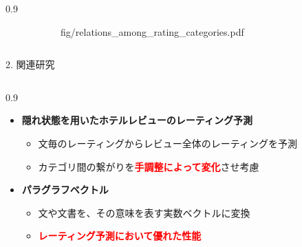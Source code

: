 \documentclass[unicode,10pt]{beamer}
\newlength{\mycolumnwidth}
\newcommand{\itemtitle}[1]{\textbf{#1}\\}
\newcommand{\fire}[1]{\textcolor{red}{\textbf{#1}}}
\begin{document}
\begin{frame}
\begin{columns}[onlytextwidth,t]
\begin{column}{0.9\mycolumnwidth}
\begin{figure}
\begin{subfigure}[t]{0.5\linewidth}
                        {fig/relations_among_rating_categories.pdf}
      \end{subfigure}
      \hspace*{\fill} %
    \end{figure}
    \vspace{0.5em}
  \end{column}
\end{columns}

\begin{block}{2. 関連研究}
  \begin{columns}[onlytextwidth,t]
    \begin{column}{0.9\mycolumnwidth}
      \begin{itemize}
        \item \itemtitle{隠れ状態を用いたホテルレビューのレーティング予測
                         \cite{fujitani15}}
          \begin{itemize}
            \item 文毎のレーティングからレビュー全体のレーティングを予測
            \item カテゴリ間の繋がりを\fire{手調整によって変化}させ考慮
          \end{itemize}
        \item \itemtitle{パラグラフベクトル\cite{quoc14}}
          \begin{itemize}
            \item 文や文書を、その意味を表す実数ベクトルに変換
            \item \fire{レーティング予測において優れた性能}
          \end{itemize}
      \end{itemize}
    \end{column}


\end{columns}
\end{block}
\end{frame}
\end{document}
